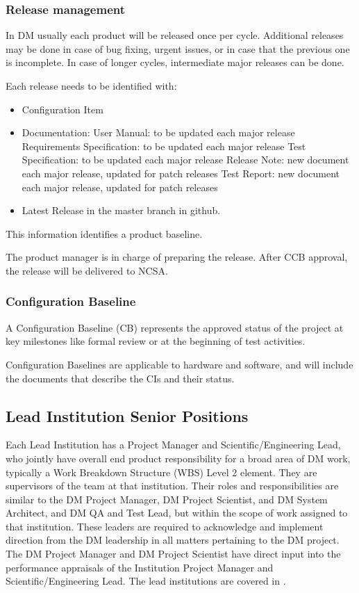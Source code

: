 \subsubsection{Release management\label{sect:relMng}}
In DM usually each product will be released once per cycle. 
Additional releases may be done in case of bug fixing, urgent issues, or in case that the previous one is incomplete.
In case of longer cycles, intermediate major releases can be done.

Each release needs to be identified with:

\begin{itemize}
\item Configuration Item
\item Documentation:
\subitem User Manual: to be updated each major release
\subitem Requirements Specification: to be updated each major release
\subitem Test Specification: to be updated each major release
\subitem Release Note: new document each major release, updated for patch releases
\subitem Test Report: new document each major release, updated for patch releases
\item Latest Release in the master branch in github.
\end{itemize}
This information identifies a product baseline.

The product manager  is in charge of preparing the release.
After CCB approval, the release will be delivered to NCSA.

\subsubsection{Configuration Baseline \label{sect:BSLdef}}
A Configuration Baseline (CB) represents the approved status of the project at key milestones like formal review 
or at the beginning of test activities.

Configuration Baselines are applicable to hardware and software, and will 
include the documents that describe the CIs and their status.


\subsection{Lead Institution Senior Positions}
Each Lead Institution has a Project Manager and Scientific/Engineering Lead, who jointly have overall end product responsibility for a broad area of DM work, typically a Work Breakdown Structure (WBS) Level 2 element. They are supervisors of the team at that institution.  Their roles and responsibilities are similar to the DM Project Manager, DM Project Scientist, and DM System Architect, and DM QA and Test Lead, but within the scope of work assigned to that institution.  These leaders are required to acknowledge and implement direction from the DM leadership in all matters pertaining to the DM project.  The DM Project Manager and DM Project Scientist have direct input into the performance appraisals of the Institution Project Manager and Scientific/Engineering Lead. 
The lead institutions are covered  in .

